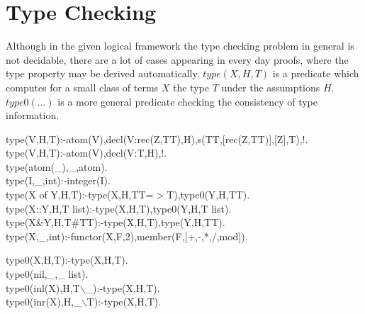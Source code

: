 \documentclass[11pt]{report}
\makeatletter
\newcommand{\ulinv}[1]{\index{#1@\texttt{#1}}}
\makeatother
\begin{document}
 \section{Type Checking}
 Although in the given logical framework the type checking 
 problem in general is not decidable, there are a lot of cases
 appearing in every day proofs, where the type property 
 may be derived automatically.
 $type(X,H,T)$ is a predicate which computes for a small class
 of terms $X$ the type $T$ under the assumptions $H$.
 $type0(...)$ is a more
 general predicate checking the consistency of type information.
 \ulinv{type}
\begin{sf}\begin{tabbing}
type(V,H,T):-atom(V),decl(V:rec(Z,TT),H),s(TT,[rec(Z,TT)],[Z],T),!.\\[-0.15ex]
type(V,H,T):-atom(V),decl(V:T,H),!.\\[-0.15ex]
type(atom(\_\hspace{0.1em}),\_\hspace{0.1em},atom).\\[-0.15ex]
type(I,\_\hspace{0.1em},int):-integer(I).\\[-0.15ex]
type(X of Y,H,T):-type(X,H,TT=$>$T),type0(Y,H,TT).\\[-0.15ex]
type(X::Y,H,T list):-type(X,H,T),type0(Y,H,T list).\\[-0.15ex]
type(X\&Y,H,T\#TT):-type(X,H,T),type(Y,H,TT).\\[-0.15ex]
type(X,\_\hspace{0.1em},int):-functor(X,F,2),member(F,[+,-,*,/,mod]).\\[-0.7ex]

\end{tabbing}\end{sf}

 \ulinv{type0}
\begin{sf}\begin{tabbing}
type0(X,H,T):-type(X,H,T).\\[-0.15ex]
type0(nil,\_\hspace{0.1em},\_\hspace{0.1em} list).\\[-0.15ex]
type0(inl(X),H,T$\backslash$\_\hspace{0.1em}):-type(X,H,T).\\[-0.15ex]
type0(inr(X),H,\_\hspace{0.1em}$\backslash$T):-type(X,H,T).
\end{tabbing}\end{sf}
\end{document}
